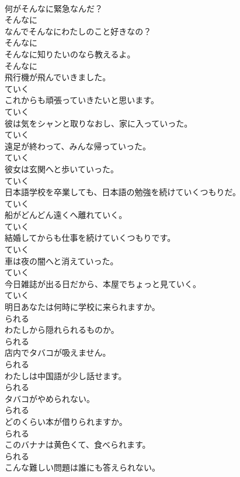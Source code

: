 \documentclass[8pt]{extreport}
\begin{document}
\begin{CJK}{UTF8}{min}
\\	何がそんなに緊急なんだ？	
\\	そんなに
\\	なんでそんなにわたしのこと好きなの？	
\\	そんなに
\\	そんなに知りたいのなら教えるよ。	
\\	そんなに
\\	飛行機が飛んでいきました。	
\\	ていく
\\	これからも頑張っていきたいと思います。	
\\	ていく
\\	彼は気をシャンと取りなおし、家に入っていった。	
\\	ていく
\\	遠足が終わって、みんな帰っていった。	
\\	ていく
\\	彼女は玄関へと歩いていった。	
\\	ていく
\\	日本語学校を卒業しても、日本語の勉強を続けていくつもりだ。	
\\	ていく
\\	船がどんどん遠くへ離れていく。	
\\	ていく
\\	結婚してからも仕事を続けていくつもりです。	
\\	ていく
\\	車は夜の闇へと消えていった。	
\\	ていく
\\	今日雑誌が出る日だから、本屋でちょっと見ていく。	
\\	ていく
\\	明日あなたは何時に学校に来られますか。	
\\	られる
\\	わたしから隠れられるものか。	
\\	られる
\\	店内でタバコが吸えません。	
\\	られる
\\	わたしは中国語が少し話せます。	
\\	られる
\\	タバコがやめられない。	
\\	られる
\\	どのくらい本が借りられますか。	
\\	られる
\\	このバナナは黄色くて、食べられます。	
\\	られる
\\	こんな難しい問題は誰にも答えられない。	

\end{CJK}
\end{document}
